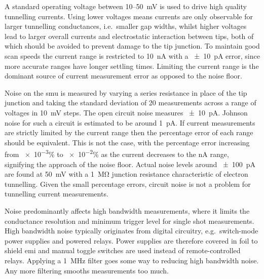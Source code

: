 \documentclass{article}
\begin{document}
A standard operating voltage between 10--\SI{50}{mV} is used to drive high quality tunnelling currents. Using lower voltages means currents are only observable for larger tunnelling conductances, i.e.\ smaller gap widths, whilst higher voltages lead to larger overall currents and electrostatic interaction between tips, both of which should be avoided to prevent damage to the tip junction. To maintain good scan speeds the current range is restricted to \SI{10}{nA} with a \SI{\pm10}{pA} error, since more accurate ranges have longer settling times. Limiting the current range is the dominant source of current measurement error as opposed to the noise floor.


Noise on the \gls{smu} is measured by varying a series resistance in place of the tip junction and taking the standard deviation of 20 measurements across a range of voltages in \SI{10}{mV} steps. The open circuit noise measures \SI{\pm10}{pA}. Johnson noise for such a circuit is estimated to be around \SI{1}{pA}.
If current measurements are strictly limited by the current range then the percentage error of each range should be equivalent. This is not the case, with the percentage error increasing from \num{e-3}\% to \num{e-2}\% as the current decreases to the nA range, signifying the approach of the noise floor. Actual noise levels around \SI{\pm100}{pA} are found at \SI{50}{mV} with a \SI{1}{\mega\ohm} junction resistance characteristic of electron tunnelling. Given the small percentage errors, circuit noise is not a problem for tunnelling current measurements.

Noise predominantly affects high bandwidth measurements, where it limits the conductance resolution and minimum trigger level for single shot measurements. High bandwidth noise typically originates from digital circuitry, e.g.\ switch-mode power supplies and powered relays. Power supplies are therefore covered in foil to shield \gls{emi} and manual toggle switches are used instead of remote-controlled relays. Applying a \SI{1}{MHz} filter goes some way to reducing high bandwidth noise. Any more filtering smooths measurements too much.
\end{document}
